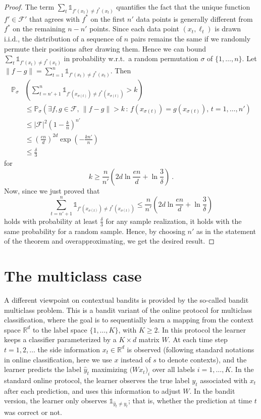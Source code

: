 \documentclass[11pt]{hackednow}
\renewcommand{\P}{\mathbb{P}}
\newcommand{\R}{\mathbb{R}}
\newcommand{\cF}{\mathcal{F}}
\def\ds1{\mathds{1}}
\newcommand{\wh}{\widehat}
\newcommand{\norm}[1]{\left\|{#1}\right\|}
\newcommand{\yhat}{\wh{y}}
\begin{document}
\begin{proof}
The term $\sum_t \ds1_{f'(x_t) \neq f^*(x_t)}$ quantifies the fact that the unique function $f'\in\cF'$ that agrees with $f^*$ on the first $n'$ data points is generally different from $f^*$ on the remaining $n-n'$ points. Since each data point $(x_t,\ell_t)$ is drawn i.i.d., the distribution of a sequence of $n$ pairs remains the same if we randomly permute their positions after drawing them. Hence we can bound
$
    \sum_t \ds1_{f'(x_t) \neq f^*(x_t)}
$
in probability w.r.t.\ a random permutation $\sigma$ of $\{1,\dots,n\}$. Let $\norm{f-g} = \sum_{t=1}^n \ds1_{f'(x_t) \neq f^*(x_t)}$. Then
\begin{align*}
    \P_\sigma&\left(\sum_{t=n'+1}^n \ds1_{f'(x_{\sigma(t)}) \neq f^*(x_{\sigma(t)})} > k\right)
\\ &\le
    \P_\sigma\left( \exists f,g \in \cF,\, \norm{f-g} > k \,:\,  f(x_{\sigma(t)})=g(x_{\sigma(t)}),\, t=1,\dots,n' \right)
\\ &\le
    |\cF|^2 \left(1-\frac{k}{n}\right)^{n'}
\\ &\le
    \left(\frac{en}{d}\right)^{2d} \exp\left(-\frac{kn'}{n}\right)
\\ &\le
    \frac{\delta}{3}
\end{align*}
for
\[
    k \ge \frac{n}{n'}\left(2d\ln\frac{en}{d} + \ln\frac{3}{\delta}\right)~.
\]
Now, since we just proved that
\[
    \sum_{t=n'+1}^n \ds1_{f'(x_{\sigma(t)}) \neq f^*(x_{\sigma(t)})}
\le
    \frac{n}{n'}\left(2d\ln\frac{en}{d} + \ln\frac{3}{\delta}\right)
\]
holds with probability at least $\tfrac{\delta}{3}$ for any sample realization, it holds with the same probability for a random sample. Hence, by choosing $n'$ as in the statement of the theorem and overapproximating, we get the desired result.
\end{proof}


\section{The multiclass case}
\label{s:multiclass}
A different viewpoint on contextual bandits is provided by the so-called bandit multiclass problem. This is a bandit variant of the online protocol for multiclass classification, where the goal is to sequentially learn a mapping from the context space $\R^d$ to the label space $\{1,\dots,K\}$, with $K \ge 2$. In this protocol the learner keeps a classifier parameterized by a $K \times d$ matrix $W$. At each time step $t=1,2,\dots$ the side information $x_t\in\R^d$ is observed (following standard notations in online classification, here we use $x$ instead of $s$ to denote contexts), and the learner predicts the label $\yhat_t$ maximizing $\bigl(Wx_t\bigr)_i$ over all labels $i=1,\dots,K$. In the standard online protocol, the learner observes the true label $y_t$ associated with $x_t$ after each prediction, and uses this information to adjust $W$. In the bandit version, the learner only observes $\ds1_{\yhat_t \neq y_t}$; that is, whether the prediction at time $t$ was correct or not.
\end{document}
